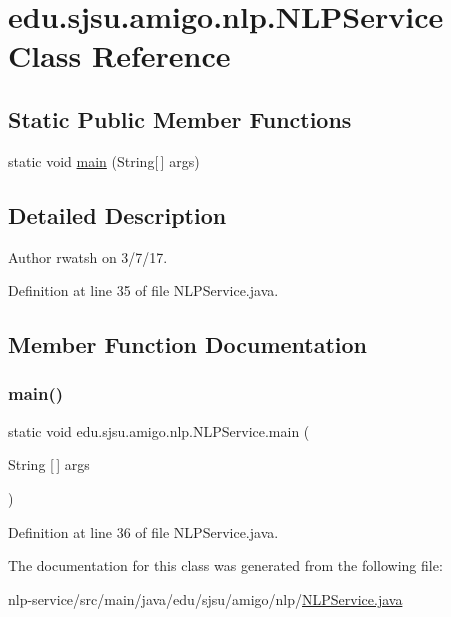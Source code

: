 \hypertarget{classedu_1_1sjsu_1_1amigo_1_1nlp_1_1_n_l_p_service}{}\section{edu.\+sjsu.\+amigo.\+nlp.\+N\+L\+P\+Service Class Reference}
\label{classedu_1_1sjsu_1_1amigo_1_1nlp_1_1_n_l_p_service}
\subsection*{Static Public Member Functions}
\begin{DoxyCompactItemize}
\item 
static void \hyperlink{classedu_1_1sjsu_1_1amigo_1_1nlp_1_1_n_l_p_service_ae5a3bd65e29eddfd88b3651d5cfa0205}{main} (String\mbox{[}$\,$\mbox{]} args)
\end{DoxyCompactItemize}


\subsection{Detailed Description}
\begin{DoxyAuthor}{Author}
rwatsh on 3/7/17. 
\end{DoxyAuthor}


Definition at line 35 of file N\+L\+P\+Service.\+java.



\subsection{Member Function Documentation}
\mbox{\label{classedu_1_1sjsu_1_1amigo_1_1nlp_1_1_n_l_p_service_ae5a3bd65e29eddfd88b3651d5cfa0205}} 
\subsubsection{\texorpdfstring{main()}{main()}}
{\footnotesize\ttfamily static void edu.\+sjsu.\+amigo.\+nlp.\+N\+L\+P\+Service.\+main (\begin{DoxyParamCaption}\item[{String \mbox{[}$\,$\mbox{]}}]{args }\end{DoxyParamCaption})\hspace{0.3cm}{\ttfamily [static]}}



Definition at line 36 of file N\+L\+P\+Service.\+java.



The documentation for this class was generated from the following file\+:\begin{DoxyCompactItemize}
\item 
nlp-\/service/src/main/java/edu/sjsu/amigo/nlp/\hyperlink{_n_l_p_service_8java}{N\+L\+P\+Service.\+java}\end{DoxyCompactItemize}
